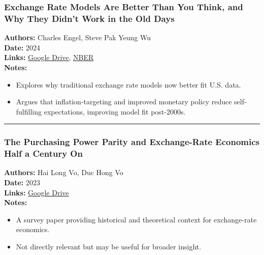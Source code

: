 \documentclass[
  11pt,
]{article}
\providecommand{\tightlist}{%
  \setlength{\itemsep}{0pt}\setlength{\parskip}{0pt}}
\begin{document}
\subsubsection{Exchange Rate Models Are Better Than You Think, and Why
They Didn't Work in the Old
Days}\label{exchange-rate-models-are-better-than-you-think-and-why-they-didnt-work-in-the-old-days}

\textbf{Authors:} Charles Engel, Steve Pak Yeung Wu\\
\textbf{Date:} 2024\\
\textbf{Links:}
\href{https://drive.google.com/file/d/1bKyyCi1qhqifzHM9Sx3ahU_tNOCwdYmz/view?usp=sharing}{Google
Drive},
\href{https://www.nber.org/system/files/working_papers/w32808/w32808.pdf}{NBER}\\
\textbf{Notes:}

\begin{itemize}
\tightlist
\item
  Explores why traditional exchange rate models now better fit U.S.
  data.
\item
  Argues that inflation-targeting and improved monetary policy reduce
  self-fulfilling expectations, improving model fit post-2000s.
\end{itemize}

\begin{center}\rule{0.5\linewidth}{0.5pt}\end{center}

\subsubsection{The Purchasing Power Parity and Exchange-Rate Economics
Half a Century
On}\label{the-purchasing-power-parity-and-exchange-rate-economics-half-a-century-on}

\textbf{Authors:} Hai Long Vo, Duc Hong Vo\\
\textbf{Date:} 2023\\
\textbf{Links:}
\href{https://drive.google.com/file/d/1GvSoUtKJiy58EFfif0aoFeuvEYS26tqs/view?usp=sharing}{Google
Drive}\\
\textbf{Notes:}

\begin{itemize}
\tightlist
\item
  A survey paper providing historical and theoretical context for
  exchange-rate economics.\\
\item
  Not directly relevant but may be useful for broader insight.
\end{itemize}
\end{document}
